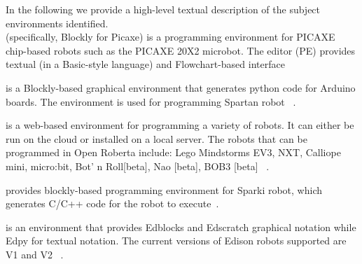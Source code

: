 In the following we provide a high-level textual description of the  subject environments identified.\\
\parhead{\picaxe} (specifically, Blockly for Picaxe) is a programming environment for PICAXE chip-based robots such as the PICAXE 20X2 microbot. The \picaxe editor (PE) provides textual (in a Basic-style language) and Flowchart-based interface %



\parhead{\ardublockly} is a Blockly-based graphical environment that generates python code for Arduino boards. The environment is used for programming Spartan robot ~\cite{Spartan}.%

\parhead{\openroberta} is a web-based environment for programming a variety of robots. It can either be run on the cloud  or installed on a local server. The  robots that can be programmed in Open Roberta include: Lego Mindstorms EV3, NXT, Calliope mini, micro:bit, Bot' n Roll[beta], Nao [beta], BOB3 [beta] ~\cite{OpenRoberta,Jost2015,Ketterl2015}. %

\parhead{\arcbotics} provides blockly-based  programming environment for Sparki robot, which generates C/C++ code for the robot to execute~\cite{ArcboticSparki}. %

\parhead{\edison} is an environment that provides Edblocks and Edscratch graphical notation while Edpy for textual notation. The current versions of Edison robots supported are V1 and V2 ~\cite{Edison}.%


